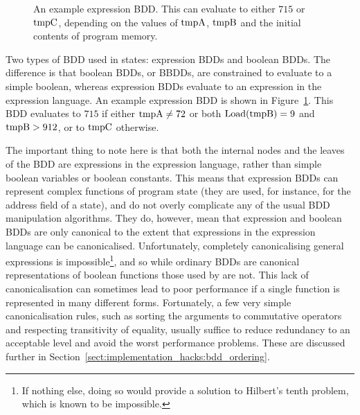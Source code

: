 \begin{wrapfigure}{r}{6.5cm}
  \caption{An example expression BDD.  This can evaluate to either
    $715$ or $\mathrm{tmpC}$, depending on the values of $\mathrm{tmpA}$,
    $\mathrm{tmpB}$ and the initial contents of program memory.}
  \label{fig:derive:example_expr_bdd}
  \vspace{-5mm}
\end{wrapfigure}
Two types of BDD used in {\StateMachine} states: expression BDDs and
boolean BDDs.  The difference is that boolean BDDs, or BBDDs, are
constrained to evaluate to a simple boolean, whereas expression BDDs
evaluate to an expression in the expression language.  An example
expression BDD is shown in Figure~\ref{fig:derive:example_expr_bdd}.
This BDD evaluates to $715$ if either $\mathrm{tmpA} \not= 72$ or both
$\mathrm{Load}(\mathrm{tmpB}) = 9$ and $\mathrm{tmpB} > 912$, or to $\mathrm{tmpC}$
otherwise.  

The important thing to note here is that both the internal nodes and
the leaves of the BDD are expressions in the expression language,
rather than simple boolean variables or boolean constants.  This means
that expression BDDs can represent complex functions of program state
(they are used, for instance, for the address field of a 
state), and do not overly complicate any of the usual BDD manipulation
algorithms.  They do, however, mean that expression and boolean BDDs
are only canonical to the extent that expressions in the expression
language can be canonicalised.  Unfortunately, completely
canonicalising general expressions is impossible\footnote{If nothing
  else, doing so would provide a solution to Hilbert's tenth problem,
  which is known to be impossible\cite{Davis1973}.}, and so while
ordinary BDDs are canonical representations of boolean functions those
used by {\technique} are not.  This lack of canonicalisation can
sometimes lead to poor performance if a single function is represented
in many different forms.  Fortunately, a few very simple
canonicalisation rules, such as sorting the arguments to commutative
operators and respecting transitivity of equality, usually suffice to
reduce redundancy to an acceptable level and avoid the worst
performance problems.  These are discussed further in
Section~\ref{sect:implementation_hacks:bdd_ordering}.

